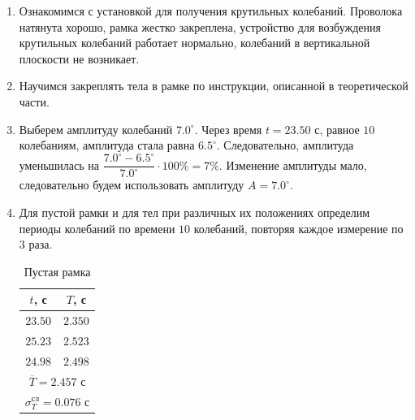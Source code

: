 \documentclass[a4paper,12pt]{article}
\begin{document}
\begin{enumerate}
    \item Ознакомимся с установкой для получения крутильных колебаний. Проволока натянута хорошо, рамка жестко закреплена, устройство для возбуждения крутильных колебаний работает нормально, колебаний в вертикальной плоскости не возникает.
    \item Научимся закреплять тела в рамке по инструкции, описанной в теоретической части.
    \item Выберем амплитуду колебаний $7.0^{\circ}$. Через время $t = 23.50$ с, равное $10$ колебаниям, амплитуда стала равна $6.5^{\circ}$. Следовательно, амплитуда уменьшилась на $\dfrac{7.0^{\circ} - 6.5^{\circ}}{7.0^{\circ}}\cdot 100\% = 7\%$. Изменение амплитуды мало, следовательно будем использовать амплитуду $A = 7.0^{\circ}$.
    \item Для пустой рамки и для тел при различных их положениях определим периоды колебаний по времени $10$ колебаний, повторяя каждое измерение по $3$ раза.
    \begin{table}[!h]
        \centering
        \begin{tabular}{|c|c|} \hline
            $t$, с & $T$, с \\ \hline
            $23.50$ & $2.350$ \\ \hline
            $25.23$ & $2.523$ \\ \hline
            $24.98$ & $2.498$ \\ \hline
            \multicolumn{2}{|c|}{$\overline{T} = 2.457$ с} \\ 
            \multicolumn{2}{|c|}{$\sigma_T^{\text{сл}} = 0.076$ с} \\ \hline
        \end{tabular}
        \caption{Пустая рамка}
    \end{table}
    


\end{enumerate}
\end{document}
